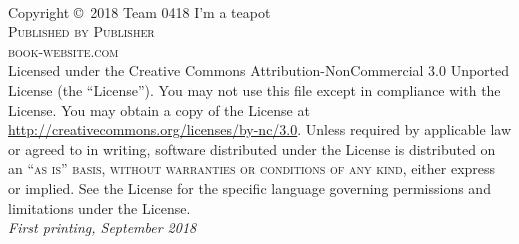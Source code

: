 
\newpage
~\vfill
\thispagestyle{empty}

\noindent 
Copyright \copyright\ 2018 Team 0418 I'm a teapot\\ %
\noindent 
\textsc{Published by Publisher}\\ %
\noindent 
\textsc{book-website.com}\\ %
\noindent Licensed under the Creative Commons Attribution-NonCommercial 3.0 Unported License (the ``License''). You may not use this file except in compliance with the License. You may obtain a copy of the License at \url{http://creativecommons.org/licenses/by-nc/3.0}. Unless required by applicable law or agreed to in writing, software distributed under the License is distributed on an \textsc{``as is'' basis, without warranties or conditions of any kind}, either express or implied. See the License for the specific language governing permissions and limitations under the License.\\ %
\noindent
\textit{First printing, September 2018} %
